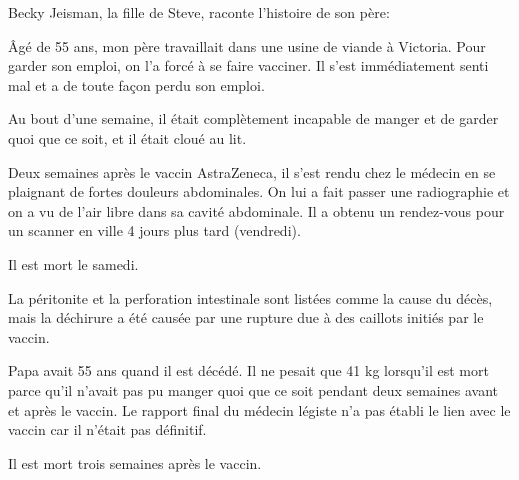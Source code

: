 Becky Jeisman, la fille de Steve, raconte l'histoire de son père:

Âgé de 55 ans, mon père travaillait dans une usine de viande à Victoria. Pour
garder son emploi, on l'a forcé à se faire vacciner. Il s'est immédiatement
senti mal et a de toute façon perdu son emploi.

Au bout d'une semaine, il était complètement incapable de manger et de garder
quoi que ce soit, et il était cloué au lit.

Deux semaines après le vaccin AstraZeneca, il s'est rendu chez le médecin en se
plaignant de fortes douleurs abdominales. On lui a fait passer une radiographie
et on a vu de l'air libre dans sa cavité abdominale. Il a obtenu un rendez-vous
pour un scanner en ville 4 jours plus tard (vendredi).

Il est mort le samedi.

La péritonite et la perforation intestinale sont listées comme la cause du
décès, mais la déchirure a été causée par une rupture due à des caillots initiés
par le vaccin.

Papa avait 55 ans quand il est décédé. Il ne pesait que 41 kg lorsqu'il est mort
parce qu'il n'avait pas pu manger quoi que ce soit pendant deux semaines avant
et après le vaccin. Le rapport final du médecin légiste n'a pas établi le lien
avec le vaccin car il n'était pas définitif.

Il est mort trois semaines après le vaccin.

